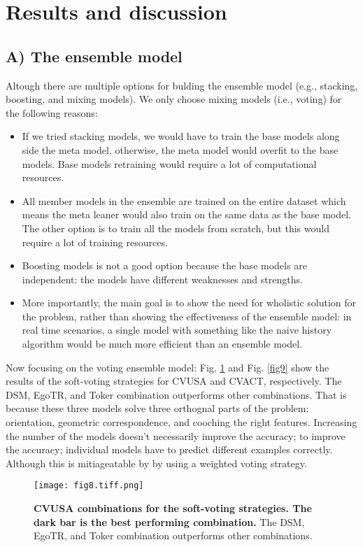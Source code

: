 \documentclass[10pt,letterpaper]{article}
\newif\ifhighlight
\newcommand{\hlb}[1]{\ifhighlight{\hl{#1}}\else{#1}\fi}
\begin{document}
\section*{Results \hlb{and discussion}}
\subsection*{A) The ensemble model}
\hlb{Altough there are multiple options for bulding the ensemble model (e.g., stacking, boosting, and mixing models). We only choose mixing models (i.e., voting) for the following reasons:}
\begin{itemize}
  \item \hlb{If we tried stacking models, we would have to train the base models along side the meta model, otherwise, the meta model would overfit to the base models. Base models retraining would require a lot of computational resources.}
  \item \hlb{All member models in the ensemble are trained on the entire dataset which means the meta leaner would also train on the same data as the base model. The other option is to train all the models from scratch, but this would require a lot of training resources.}
  \item \hlb{Boosting models is not a good option because the base models are independent: the models have different weaknesses and strengths.}
  \item \hlb{More importantly, the main goal is to show the need for wholistic solution for the problem, rather than showing the effectiveness of the ensemble model: in real time scenarios, a single model with something like the naive history algorithm would be much more efficient than an ensemble model.}
\end{itemize}
\hlb{Now focusing on the voting ensemble model: } \hlb{Fig.} \ref{fig8} and \hlb{Fig.} \ref{fig9} show the results of the soft-voting strategies for CVUSA and CVACT, respectively. The DSM, EgoTR, and Toker combination outperforms other combinations. \hlb{That is because these three models solve three orthognal parts of the problem: orientation, geometric correspondence, and cooching the right features.}  Increasing the number of the models doesn’t necessarily improve the accuracy; to improve the accuracy; individual models have to predict different examples correctly. \hlb{Although this is mitiageatable by by using a weighted voting strategy.}

\begin{figure}[!ht]
  \caption{{\bf CVUSA combinations for the soft-voting strategies. The dark bar is the best performing combination.} The DSM, EgoTR, and Toker combination outperforms other combinations.}
  \texttt{[image: fig8.tiff.png]}
  
  \label{fig8}
\end{figure}
\end{document}
